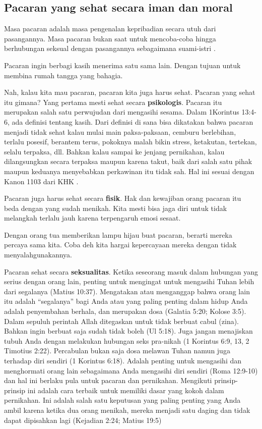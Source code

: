 \documentclass[a4paper,11pt,openany]{article}
\begin{document}
\subsection*{Pacaran yang sehat secara iman dan moral}
Masa pacaran adalah masa pengenalan kepribadian secara utuh dari pasangannya. Masa pacaran bukan saat untuk mencoba-coba hingga berhubungan seksual dengan pasangannya sebagaimana suami-istri \cite{kriswanta2009}.

Pacaran ingin berbagi kasih menerima satu sama lain. Dengan tujuan untuk membina rumah tangga yang bahagia. 

Nah, kalau kita mau pacaran, pacaran kita juga harus sehat. Pacaran yang sehat itu gimana? Yang pertama mesti sehat secara \textbf{psikologis}. Pacaran itu merupakan salah satu perwujudan dari mengasihi sesama. Dalam 1Korintus 13:4-6, ada definisi tentang kasih. Dari definisi di sana bisa dikatakan bahwa pacaran menjadi tidak sehat kalau mulai main paksa-paksaan, cemburu berlebihan, terlalu posesif, berantem terus, pokoknya malah bikin stress, ketakutan, tertekan, selalu terpaksa, dll. 
Bahkan kalau sampai ke jenjang pernikahan, kalau dilangsungkan secara terpaksa maupun karena takut, baik dari salah satu pihak maupun keduanya menyebabkan perkawinan itu tidak sah. Hal ini sesuai dengan Kanon 1103 dari KHK \cite{khk2011}.

Pacaran juga harus sehat secara \textbf{fisik}. Hak dan kewajiban orang pacaran itu beda dengan yang sudah menikah. Kita mesti bisa jaga diri untuk tidak melangkah terlalu jauh karena terpengaruh emosi sesaat. 

Dengan orang tua memberikan lampu hijau buat pacaran, berarti mereka percaya sama kita. Coba deh kita hargai kepercayaan mereka dengan tidak menyalahgunakannya.

Pacaran sehat secara \textbf{seksualitas}. 
Ketika seseorang masuk dalam hubungan yang serius dengan orang lain, penting untuk mengingat untuk mengasihi Tuhan lebih dari segalanya (Matius 10:37). Mengatakan atau menganggap bahwa orang lain itu adalah ``segalanya'' bagi Anda atau yang paling penting dalam hidup Anda adalah penyembahan berhala, dan merupakan dosa (Galatia 5:20; Kolose 3:5). Dalam sepuluh perintah Allah ditegaskan untuk tidak berbuat cabul (zina). Bahkan ingin berbuat saja sudah tidak boleh (Ul 5:18). Juga jangan menajiskan tubuh Anda dengan melakukan hubungan seks pra-nikah (1 Korintus 6:9, 13, 2 Timotius 2:22). Percabulan bukan saja dosa melawan Tuhan namun juga terhadap diri sendiri (1 Korintus 6:18). Adalah penting untuk mengasihi dan menghormati orang lain sebagaimana Anda mengasihi diri sendiri (Roma 12:9-10) dan hal ini berlaku pula untuk pacaran dan pernikahan. Mengikuti prinsip-prinsip ini adalah cara terbaik untuk memiliki dasar yang kokoh dalam pernikahan. Ini adalah salah satu keputusan yang paling penting yang Anda ambil karena ketika dua orang menikah, mereka menjadi satu daging dan tidak dapat dipisahkan lagi (Kejadian 2:24; Matius 19:5)
\end{document}

